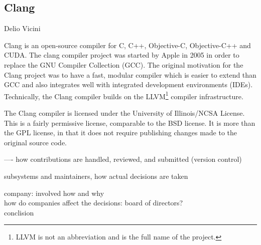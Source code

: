 \subsection{Clang}{Delio Vicini}

Clang is an open-source compiler for C, C++, Objective-C, Objective-C++ and CUDA. The clang compiler project was started by Apple in 2005 in order to replace the GNU Compiler Collection (GCC). The original motivation for the Clang project was to have a fast, modular compiler which is easier to extend
than GCC and also integrates well with integrated development environments (IDEs). \cite{clang-motivation} Technically, the Clang compiler builds on the LLVM\footnote{LLVM is not an abbreviation and is the full name of the project.} compiler infrastructure. 

The Clang compiler is licensed under the University of Illinois/NCSA License. \cite{clang-policy} This is a fairly permissive license, comparable to the BSD license. It is more than the GPL license, in that it does not require publishing changes made to the original source code. \cite{illinois-license}


----
how contributions are handled, reviewed, and submitted (version control)

subsystems and maintainers, how actual decisions are taken

company: involved how and why \\

how do companies affect the decisions: board of directors?\\


conclision



